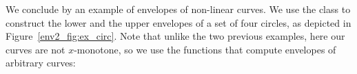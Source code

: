 We conclude by an example of envelopes of non-linear curves. 
We use the  class to construct the
lower and the upper envelopes of a set of four circles, as depicted
in Figure~\ref{env2_fig:ex_circ}. Note that unlike the two previous
examples, here our curves are not $x$-monotone, so we use the functions
that compute envelopes of arbitrary curves:

